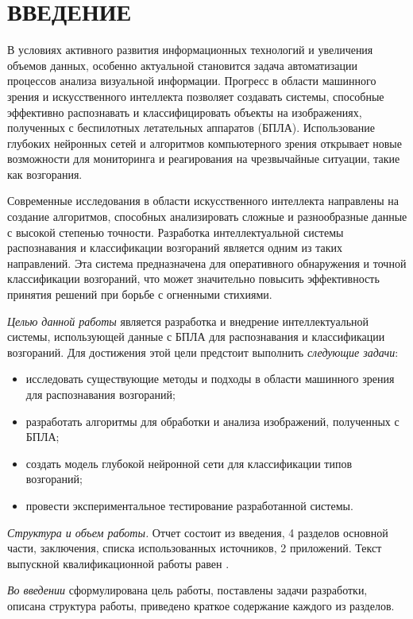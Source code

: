 \section*{ВВЕДЕНИЕ}

В условиях активного развития информационных технологий и увеличения объемов данных, особенно актуальной становится задача автоматизации процессов анализа визуальной информации. Прогресс в области машинного зрения и искусственного интеллекта позволяет создавать системы, способные эффективно распознавать и классифицировать объекты на изображениях, полученных с беспилотных летательных аппаратов (БПЛА). Использование глубоких нейронных сетей и алгоритмов компьютерного зрения открывает новые возможности для мониторинга и реагирования на чрезвычайные ситуации, такие как возгорания.

Современные исследования в области искусственного интеллекта направлены на создание алгоритмов, способных анализировать сложные и разнообразные данные с высокой степенью точности. Разработка интеллектуальной системы распознавания и классификации возгораний является одним из таких направлений. Эта система предназначена для оперативного обнаружения и точной классификации возгораний, что может значительно повысить эффективность принятия решений при борьбе с огненными стихиями.

\emph{Целью данной работы} является разработка и внедрение интеллектуальной системы, использующей данные с БПЛА для распознавания и классификации возгораний. Для достижения этой цели предстоит выполнить \emph{следующие задачи}:
\begin{itemize}
\item исследовать существующие методы и подходы в области машинного зрения для распознавания возгораний;
\item разработать алгоритмы для обработки и анализа изображений, полученных с БПЛА;
\item создать модель глубокой нейронной сети для классификации типов возгораний;
\item провести экспериментальное тестирование разработанной системы.
\end{itemize}

\emph{Структура и объем работы.} Отчет состоит из введения, 4 разделов основной части, заключения, списка использованных источников, 2 приложений. Текст выпускной квалификационной работы равен .

\emph{Во введении} сформулирована цель работы, поставлены задачи разработки, описана структура работы, приведено краткое содержание каждого из разделов.

